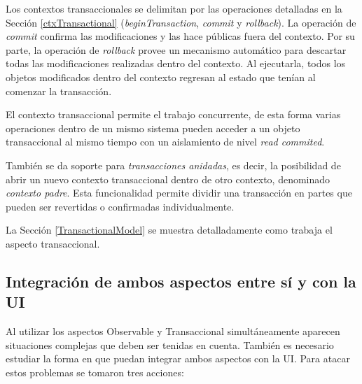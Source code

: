 		Los contextos transaccionales se delimitan por las
		operaciones detalladas en la Sección \ref{ctxTransactional}
		(\emph{beginTransaction}, \emph{commit} y \emph{rollback}).
		La operación de \emph{commit} confirma las modificaciones y las hace públicas
		fuera del contexto.
		Por su parte, la operación de \emph{rollback} provee un
		mecanismo automático para descartar todas las modificaciones realizadas
		dentro del contexto.
		Al ejecutarla, todos los objetos modificados dentro del contexto regresan al
		estado que tenían al comenzar la transacción.
		 
		El contexto transaccional permite el trabajo concurrente, de esta forma
		varias operaciones dentro de un mismo sistema pueden acceder a un objeto transaccional al mismo
		tiempo con un aislamiento de nivel \emph{read commited}.
				 
		También se da soporte para \emph{transacciones anidadas}, es decir, la
		posibilidad de abrir un nuevo contexto transaccional dentro de otro contexto,
		denominado \emph{contexto padre}.
		Esta funcionalidad permite dividir una transacción en partes que pueden ser
		revertidas o confirmadas individualmente.
		
		La Sección \ref{TransactionalModel} se muestra detalladamente como trabaja el
		aspecto transaccional.
		
		
		
	\subsection{Integración de ambos aspectos entre sí y con la UI}
	\label{sec:Union}
		Al utilizar los aspectos Observable y Transaccional simultáneamente aparecen
		situaciones complejas que deben ser tenidas en cuenta. 
		También es necesario estudiar la forma en que puedan integrar ambos aspectos
		con la UI.
		Para atacar estos problemas se tomaron tres acciones:
		
